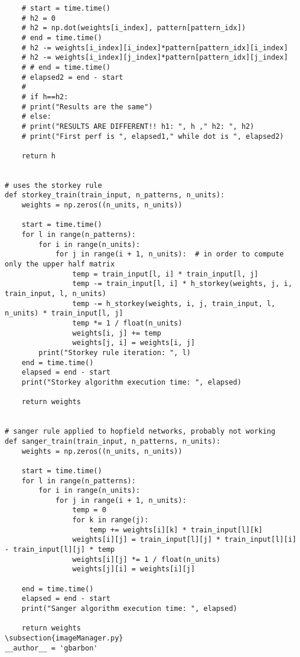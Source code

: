 \documentclass[letterpaper,twocolumn,10pt]{article}
\begin{document}
\begin{lstlisting}
    # start = time.time()
    # h2 = 0
    # h2 = np.dot(weights[i_index], pattern[pattern_idx])
    # end = time.time()
    # h2 -= weights[i_index][i_index]*pattern[pattern_idx][i_index]
    # h2 -= weights[i_index][j_index]*pattern[pattern_idx][j_index]
    # # end = time.time()
    # elapsed2 = end - start
    #
    # if h==h2:
    # print("Results are the same")
    # else:
    # print("RESULTS ARE DIFFERENT!! h1: ", h ," h2: ", h2)
    # print("First perf is ", elapsed1," while dot is ", elapsed2)

    return h


# uses the storkey rule
def storkey_train(train_input, n_patterns, n_units):
    weights = np.zeros((n_units, n_units))

    start = time.time()
    for l in range(n_patterns):
        for i in range(n_units):
            for j in range(i + 1, n_units):  # in order to compute only the upper half matrix
                temp = train_input[l, i] * train_input[l, j]
                temp -= train_input[l, i] * h_storkey(weights, j, i, train_input, l, n_units)
                temp -= h_storkey(weights, i, j, train_input, l, n_units) * train_input[l, j]
                temp *= 1 / float(n_units)
                weights[i, j] += temp
                weights[j, i] = weights[i, j]
        print("Storkey rule iteration: ", l)
    end = time.time()
    elapsed = end - start
    print("Storkey algorithm execution time: ", elapsed)

    return weights


# sanger rule applied to hopfield networks, probably not working
def sanger_train(train_input, n_patterns, n_units):
    weights = np.zeros((n_units, n_units))

    start = time.time()
    for l in range(n_patterns):
        for i in range(n_units):
            for j in range(i + 1, n_units):
                temp = 0
                for k in range(j):
                    temp += weights[i][k] * train_input[l][k]
                weights[i][j] = train_input[l][j] * train_input[l][i] - train_input[l][j] * temp
                weights[i][j] *= 1 / float(n_units)
                weights[j][i] = weights[i][j]

    end = time.time()
    elapsed = end - start
    print("Sanger algorithm execution time: ", elapsed)

    return weights
\subsection{imageManager.py}
__author__ = 'gbarbon'


\end{lstlisting}
\end{document}

